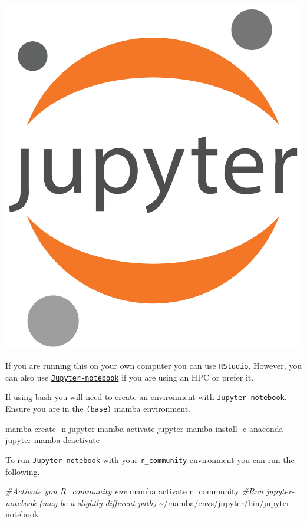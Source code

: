 \documentclass[
]{book}
\newenvironment{Shaded}{\begin{snugshade}}{\end{snugshade}}
\newcommand{\AttributeTok}[1]{\textcolor[rgb]{0.13,0.29,0.53}{#1}}
\newcommand{\CommentTok}[1]{\textcolor[rgb]{0.56,0.35,0.01}{\textit{#1}}}
\newcommand{\ExtensionTok}[1]{#1}
\newcommand{\NormalTok}[1]{#1}
\begin{document}
\includegraphics{figures/jupyter_logo.png}

If you are running this on your own computer you can use \texttt{RStudio}.
However, you can also use \href{https://jupyter.org/}{\texttt{Jupyter-notebook}} if you are using an HPC or prefer it.

If using bash you will need to create an environment with \texttt{Jupyter-notebook}.
Ensure you are in the \texttt{(base)} mamba environment.

\begin{Shaded}
\begin{Highlighting}[]
\ExtensionTok{mamba}\NormalTok{ create }\AttributeTok{{-}n}\NormalTok{ jupyter}
\ExtensionTok{mamba}\NormalTok{ activate jupyter}
\ExtensionTok{mamba}\NormalTok{ install }\AttributeTok{{-}c}\NormalTok{ anaconda jupyter}
\ExtensionTok{mamba}\NormalTok{ deactivate}
\end{Highlighting}
\end{Shaded}

To run \texttt{Jupyter-notebook} with your \texttt{r\_community} environment you can run the following.

\begin{Shaded}
\begin{Highlighting}[]
\CommentTok{\#Activate you R\_community env}
\ExtensionTok{mamba}\NormalTok{ activate r\_community}
\CommentTok{\#Run jupyter{-}notebook (may be a slightly different path)}
\ExtensionTok{\textasciitilde{}/mamba/envs/jupyter/bin/jupyter{-}notebook}
\end{Highlighting}
\end{Shaded}
\end{document}

